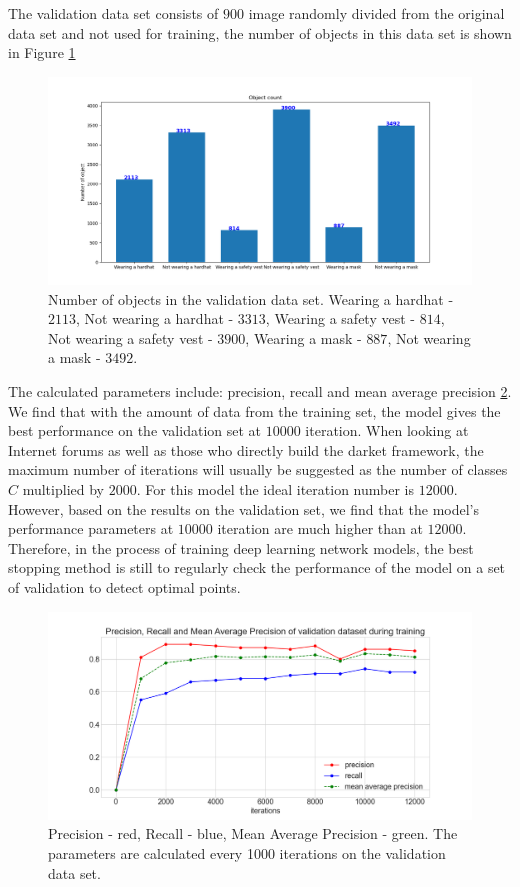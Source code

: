 \documentclass[conference]{IEEEtran}
\begin{document}
The validation data set consists of $ 900 $ image randomly divided from the original data set and not used for training, the number of objects in this data set is shown in Figure \ref{fig:validation_set}
\begin{figure}[ht]
	\centerline{\includegraphics[scale=0.3]{images/validation_set.png}}
  	\caption{Number of objects in the validation data set. Wearing a hardhat - $2113$, Not wearing a hardhat - $3313$, Wearing a safety vest - $814$, Not wearing a safety vest - $3900$, Wearing a mask - $887$, Not wearing a mask - $3492$.}
  	\label{fig:validation_set}
\end{figure}

The calculated parameters include: precision, recall and mean average precision \ref{fig:precision_recall_map}. We find that with the amount of data from the training set, the model gives the best performance on the validation set at $ 10000 $ iteration. When looking at Internet forums as well as those who directly build the darket framework, the maximum number of iterations will usually be suggested as the number of classes $ C $ multiplied by $ 2000 $. For this model the ideal iteration number is $ 12000 $. However, based on the results on the validation set, we find that the model's performance parameters at $ 10000 $ iteration are much higher than at $ 12000 $. Therefore, in the process of training deep learning network models, the best stopping method is still to regularly check the performance of the model on a set of validation to detect optimal points.

\begin{figure}[ht!]
	\centerline{\includegraphics[scale=0.3]{images/precision_recall_map.png}}
  	\caption{Precision - red, Recall - blue, Mean Average Precision - green. The parameters are calculated every 1000 iterations on the validation data set.}
  	\label{fig:precision_recall_map}
\end{figure}
\end{document}
